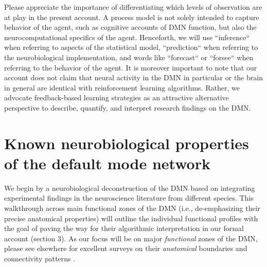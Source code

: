 \documentclass[10pt,letterpaper]{article}
\begin{document}
Please appreciate the importance of differentiating which levels of observation are at play in the present account. A process model is not solely intended to capture behavior of the agent, such as cognitive accounts of DMN function, but also the neurocomputational specifics of the agent. Henceforth, we will use ``inference`` when referring to aspects of the statistical model, ``prediction`` when referring to the neurobiological implementation, and words like ``forecast`` or ``forsee`` when referring to the behavior of the agent.
%
It is moreover important to note that
our account does not claim that neural activity in the DMN in particular
or the brain in general are identical with reinforcement learning algorithms.
Rather, we advocate feedback-based learning strategies as an attractive alternative perspective
to describe, quantify, and interpret research findings on the DMN.



\section{Known neurobiological properties of the default mode network}
\label{sec:nodes}
We begin by a neurobiological deconstruction of the DMN
based on integrating experimental findings in the neuroscience literature
from different species.
This walkthrough across main functional zones of the DMN
(i.e., de-emphasizing their precise anatomical properties)
will outline the individual functional profiles with the goal of
paving the way for their algorithmic interpretation
in our formal account (section 3).
As our focus will be on major \textit{functional} zones of the DMN,
please see elsewhere for excellent surveys on their \textit{anatomical}
boundaries and connectivity patterns \citep{randy2008, binder2009, seghier2013angular}.
\end{document}
